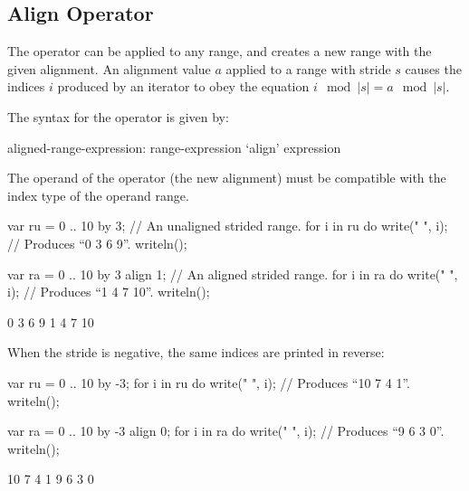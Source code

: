 \subsection{Align Operator}
\label{Align_Operator}

The  operator can be applied to any range, and creates a new range
with the given alignment.  
An alignment value $a$ applied to a range with stride $s$ causes the indices $i$ produced by an iterator
to obey the equation $i\mod |s| = a\mod |s|$.

The syntax for
the  operator is given by:
\begin{syntax}
aligned-range-expression:
  range-expression `align' expression
\end{syntax}

The operand of the  operator (the new alignment) must be compatible
with the index type of the operand range.  

\begin{example}
\begin{chapelpre}
\end{chapelpre}
\begin{chapel}
var ru = 0 .. 10 by 3;			// An unaligned strided range.
for i in ru do
  write(" ", i);			// Produces ``0 3 6 9''.
writeln();

var ra = 0 .. 10 by 3 align 1;		// An aligned strided range.
for i in ra do
  write(" ", i);			// Produces ``1 4 7 10''.
writeln();
\end{chapel}
\begin{chapeloutput}
 0 3 6 9
 1 4 7 10
\end{chapeloutput}
\end{example}

When the stride is negative, the same indices are printed in reverse:
\begin{example}
\begin{chapelpre}
\end{chapelpre}
\begin{chapel}
var ru = 0 .. 10 by -3;
for i in ru do write(" ", i);		// Produces ``10 7 4 1''.
writeln();

var ra = 0 .. 10 by -3 align 0;
for i in ra do write(" ", i);		// Produces ``9 6 3 0''.
writeln();
\end{chapel}
\begin{chapeloutput}
 10 7 4 1
 9 6 3 0
\end{chapeloutput}
\end{example}

